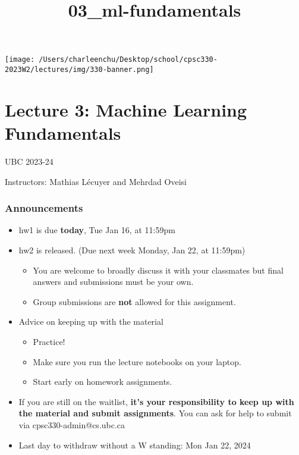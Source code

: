 \documentclass[11pt]{article}
\title{03\_ml-fundamentals}
\providecommand{\tightlist}{%
      \setlength{\itemsep}{0pt}\setlength{\parskip}{0pt}}
\begin{document}
    
    \maketitle
    
    

    
    \texttt{[image: /Users/charleenchu/Desktop/school/cpsc330-2023W2/lectures/img/330-banner.png]}

    \section{Lecture 3: Machine Learning
Fundamentals}\label{lecture-3-machine-learning-fundamentals}

UBC 2023-24

Instructors: Mathias Lécuyer and Mehrdad Oveisi

    \subsubsection{Announcements}\label{announcements}

\begin{itemize}
\tightlist
\item
  hw1 is due \textbf{today}, Tue Jan 16, at 11:59pm
\item
  hw2 is released. (Due next week Monday, Jan 22, at 11:59pm)

  \begin{itemize}
  \tightlist
  \item
    You are welcome to broadly discuss it with your classmates but final
    answers and submissions must be your own.
  \item
    Group submissions are \textbf{not} allowed for this assignment.
  \end{itemize}
\item
  Advice on keeping up with the material

  \begin{itemize}
  \tightlist
  \item
    Practice!
  \item
    Make sure you run the lecture notebooks on your laptop.
  \item
    Start early on homework assignments.\\
  \end{itemize}
\item
  If you are still on the waitlist, \textbf{it's your responsibility to
  keep up with the material and submit assignments}. You can ask for
  help to submit via cpsc330-admin@cs.ubc.ca
\item
  Last day to withdraw without a W standing: Mon Jan 22, 2024
\end{itemize}
\end{document}
